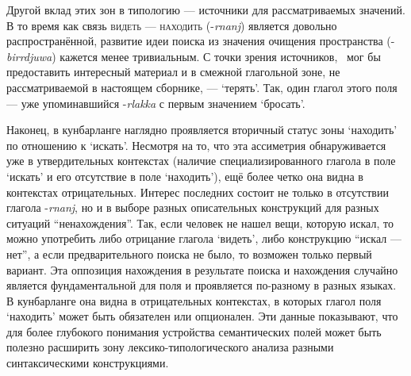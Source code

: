 Другой вклад этих зон в типологию --- источники для рассматриваемых значений. В то время как связь \textsc{видеть} --- \textsc{находить} (-\textit{rnanj}) является довольно распространённой, развитие идеи поиска из значения очищения пространства (-\textit{birrdjuwa}) кажется менее тривиальным. С точки зрения источников, \  мог бы предоставить интересный материал и в смежной глагольной зоне, не рассматриваемой в настоящем сборнике, --- `терять'. Так, один глагол этого поля --- уже упоминавшийся -\textit{rlakka} с первым значением `бросать'.

Наконец, в кунбарланге наглядно проявляется вторичный статус зоны `находить' по отношению к `искать'. Несмотря на то, что эта ассиметрия обнаруживается уже в утвердительных контекстах (наличие специализированного глагола в поле `искать' и его отсутствие в поле `находить'), ещё более четко она видна в контекстах отрицательных. Интерес последних состоит не только в отсутствии глагола -\textit{rnanj}, но и в выборе разных описательных конструкций для разных ситуаций ``ненахождения''. Так, если человек не нашел вещи, которую искал, то можно употребить либо отрицание глагола `видеть', либо конструкцию ``искал --- нет'', а если предварительного поиска не было, то возможен только первый вариант. Эта оппозиция нахождения в результате поиска и нахождения случайно является фундаментальной для поля и проявляется по-разному в разных языках. В кунбарланге она видна в отрицательных контекстах, в которых  глагол поля `находить' может быть обязателен или опционален. Эти данные показывают, что для более глубокого понимания устройства семантических полей может быть полезно расширить зону лексико-типологического анализа разными синтаксическими конструкциями.



